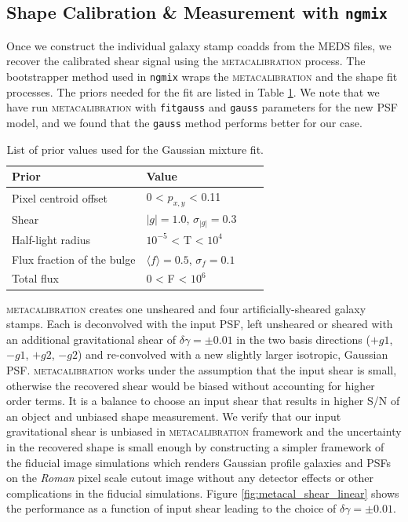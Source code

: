 \documentclass[fleqn,usenatbib]{mnras}
\begin{document}
\par

\subsection{Shape Calibration \& Measurement with \texttt{ngmix}}
\label{subsec:mcal}
Once we construct the individual galaxy stamp coadds from the MEDS files, we recover the calibrated shear signal using the \textsc{metacalibration} process. The bootstrapper method used in \texttt{ngmix} wraps the \textsc{metacalibration} and the shape fit processes. The priors needed for the fit are listed in Table \ref{tab:priors}. We note that we have run \textsc{metacalibration} with \texttt{fitgauss} and \texttt{gauss} parameters for the new PSF model, and we found that the \texttt{gauss} method performs better for our case.

\begin{table}
    \centering
    \begin{tabular}{|p{3cm}||p{3cm}|p{3cm}|p{3cm}|}
    \hline
    Prior & Value \\
    \hline
    Pixel centroid offset & 0 < $p_{x,y}$ < 0.11\\
    Shear & $|g|=1.0$, $\sigma_{|g|} = 0.3$\\
    Half-light radius & $10^{-5}$ < T < $10^{4}$\\
    Flux fraction of the bulge  & $\langle f\rangle = 0.5$, $\sigma_{f} = 0.1$\\
    Total flux & $0$ < F < $10^{6}$\\
    \hline
    \end{tabular}
    \caption{List of prior values used for the Gaussian mixture fit.}
    \label{tab:priors}
\end{table}

\textsc{metacalibration} creates one unsheared and four artificially-sheared galaxy stamps. Each is deconvolved with the input PSF, left unsheared or sheared with an additional gravitational shear of $\delta\gamma=\pm 0.01$ in the two basis directions ($+g1$, $-g1$, $+g2$, $-g2$) and re-convolved with a new slightly larger isotropic, Gaussian PSF. \textsc{metacalibration} works under the assumption that the input shear is small, otherwise the recovered shear would be biased without accounting for higher order terms. It is a balance to choose an input shear that results in higher S/N of an object and unbiased shape measurement. We verify that our input gravitational shear is unbiased in \textsc{metacalibration} framework and the uncertainty in the recovered shape is small enough by constructing a simpler framework of the fiducial image simulations which renders Gaussian profile galaxies and PSFs on the \emph{Roman} pixel scale cutout image without any detector effects or other complications in the fiducial simulations. Figure \ref{fig:metacal_shear_linear} shows the performance as a function of input shear leading to the choice of $\delta\gamma=\pm 0.01$. 
\end{document}
